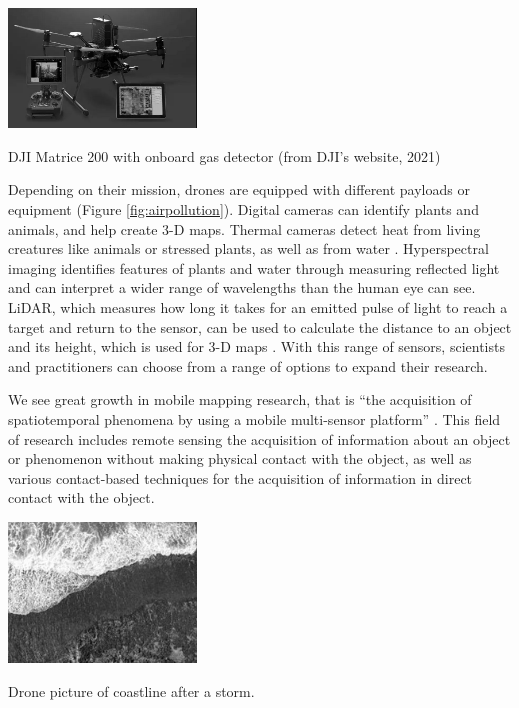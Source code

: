 \begin{marginfigure}%
    \raggedright 
    \includegraphics[width=5cm]{images/stage_graphs/environment_results/air_monitoring_drone_bw.jpg}
    \caption{DJI Matrice 200 with onboard gas detector (from DJI's website, 2021)}
    \label{fig:airpollution}
\end{marginfigure}    

Depending on their mission, drones are equipped with different payloads or equipment (Figure \ref{fig:airpollution}). Digital cameras can identify plants and animals, and help create 3-D maps.  Thermal cameras detect heat from living creatures like animals or stressed plants, as well as from water \cite{metrology_survey}. Hyperspectral imaging identifies features of plants and water through measuring reflected light and can interpret a wider range of wavelengths than the human eye can see. LiDAR, which measures how long it takes for an emitted pulse of light to reach a target and return to the sensor, can be used to calculate the distance to an object and its height, which is used for 3-D maps \cite{metrology_survey}. With this range of sensors, scientists and practitioners can choose from a range of options to expand their research. 

We see great growth in mobile mapping research, that is “the acquisition of spatiotemporal phenomena by
using a mobile multi-sensor platform” \cite{mobile_mapping}. This field of research includes remote sensing \cite{remote_sensing} the acquisition of information about an object or phenomenon without making physical contact with the object, as well as various contact-based techniques \cite{sensor_placement_uav} for the acquisition of information in direct contact with the object.

\begin{marginfigure}%
  \includegraphics[width=5cm, center]{images/intro/coastal_bw.jpg}
  \caption{Drone picture of coastline after a storm.} 
  \label{fig:coastal}
\end{marginfigure}

